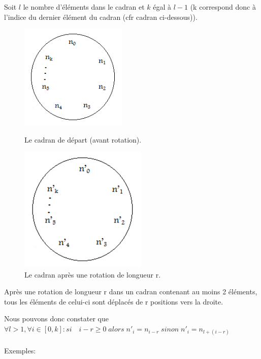 	Soit $l$ le nombre d’éléments dans le cadran et $k$ égal à $l-1$ (k correspond donc à l’indice du dernier élément du cadran (cfr cadran ci-dessous)).
	
	\begin{figure}[h]
		\centering
		\parbox{5cm}{
			\includegraphics[height=5cm]{1}
			\caption{Le cadran de départ (avant rotation).}
			\label{fig:2figsA}}
		\qquad
		\begin{minipage}{5cm}
			\includegraphics[height=6cm]{2}
			\caption{Le cadran après une rotation de longueur r.}
			\label{fig:2figsB}
		\end{minipage}
	\end{figure}
	
	Après une rotation de longueur r dans un cadran contenant au moins 2 éléments, tous les éléments de celui-ci sont déplacés de r positions vers la droite.
	
	Nous pouvons donc constater que $ \forall l > 1, \forall i \in [0,k]: si\quad i-r \geq 0 \; alors \; n'_i = n_{i-r} \; sinon \; n'_i = n_{l+(i-r)}$
	\\\\
	Exemples:

